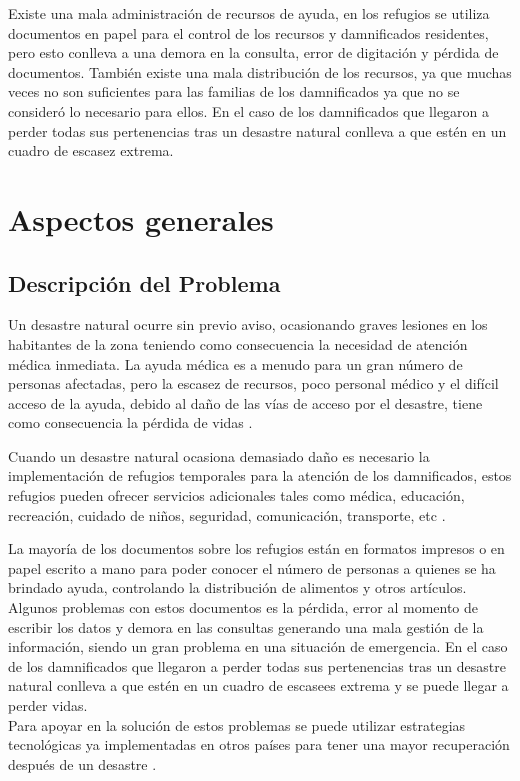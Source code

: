 \documentclass[11pt,openany]{book}
\newcounter{ns}
\begin{document}
	Existe una mala administración de recursos de ayuda, en los refugios se utiliza documentos en papel para el control de los recursos y damnificados residentes, pero esto conlleva a una demora en la consulta, error de digitación y pérdida de documentos. También existe una mala distribución de los recursos, ya que muchas veces no son suficientes para las familias de los damnificados ya que no se consideró lo necesario para ellos. En el caso de los damnificados que llegaron a perder todas sus pertenencias tras un desastre natural conlleva a que estén en un cuadro de escasez extrema.

	\chapter{Aspectos generales}
	\newpage

	\section{Descripción del Problema}

	Un desastre natural ocurre sin previo aviso, ocasionando graves lesiones en los habitantes de la zona teniendo como consecuencia la necesidad de atención médica inmediata. La ayuda médica es a menudo para un gran número de personas afectadas, pero la escasez de recursos, poco personal médico y el difícil acceso de la ayuda, debido al daño de las vías de acceso por el desastre, tiene como consecuencia la pérdida de vidas \cite{Lupu2013}.

	Cuando un desastre natural ocasiona demasiado daño es necesario la implementación de refugios temporales para la atención de los damnificados, estos refugios pueden ofrecer servicios adicionales tales como médica, educación, recreación, cuidado de niños, seguridad, comunicación, transporte, etc \cite{CruzRoja}.

	La mayoría de los documentos sobre los refugios están en formatos impresos o en papel escrito a mano para poder conocer el número de personas a quienes se ha brindado ayuda, controlando la distribución de alimentos y otros artículos\cite{Wister2015}. Algunos problemas con estos documentos es la pérdida, error al momento de escribir los datos y demora en las consultas generando una mala gestión de la información, siendo un gran problema en una situación de emergencia. En el caso de los damnificados que llegaron a perder todas sus pertenencias tras un desastre natural conlleva a que estén en un cuadro de escasees extrema y se puede llegar a perder vidas.\\
	Para apoyar en la solución de estos problemas se puede utilizar estrategias tecnológicas ya implementadas en otros países para tener una mayor recuperación después de un desastre \cite{Wister2015,Wister2013,HernandezGoya2014,Al-Akkad}.
\end{document}
